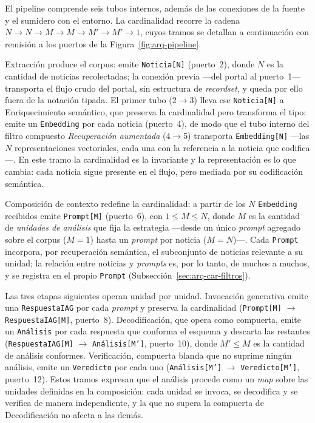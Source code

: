 \documentclass[12pt]{report}
\begin{document}
El pipeline comprende seis tubos internos, además de las conexiones de la fuente y el sumidero con el entorno. La cardinalidad recorre la cadena \(N \to N \to M \to M \to M' \to M' \to 1\), cuyos tramos se detallan a continuación con remisión a los puertos de la Figura~\ref{fig:arq-pipeline}.

Extracción produce el corpus: emite \texttt{Noticia[N]} (puerto~2), donde \(N\) es la cantidad de noticias recolectadas; la conexión previa ---del portal al puerto~1--- transporta el flujo crudo del portal, sin estructura de \textit{recordset}, y queda por ello fuera de la notación tipada. El primer tubo (2\(\to\)3) lleva ese \texttt{Noticia[N]} a Enriquecimiento semántico, que preserva la cardinalidad pero transforma el tipo: emite un \texttt{Embedding} por cada noticia (puerto~4), de modo que el tubo interno del filtro compuesto \textit{Recuperación aumentada} (4\(\to\)5) transporta \texttt{Embedding[N]} ---las \(N\) representaciones vectoriales, cada una con la referencia a la noticia que codifica---. En este tramo la cardinalidad es la invariante y la representación es lo que cambia: cada noticia sigue presente en el flujo, pero mediada por su codificación semántica.

Composición de contexto redefine la cardinalidad: a partir de los \(N\) \texttt{Embedding} recibidos emite \texttt{Prompt[M]} (puerto~6), con \(1 \le M \le N\), donde \(M\) es la cantidad de \textit{unidades de análisis} que fija la estrategia ---desde un único \textit{prompt} agregado sobre el corpus (\(M=1\)) hasta un \textit{prompt} por noticia (\(M=N\))---. Cada \texttt{Prompt} incorpora, por recuperación semántica, el subconjunto de noticias relevante a su unidad; la relación entre noticias y \textit{prompts} es, por lo tanto, de muchos a muchos, y se registra en el propio \texttt{Prompt} (Subsección~\ref{sec:arq-car-filtros}).

Las tres etapas siguientes operan unidad por unidad. Invocación generativa emite una \texttt{RespuestaIAG} por cada \textit{prompt} y preserva la cardinalidad (\texttt{Prompt[M]} \(\to\) \texttt{RespuestaIAG[M]}, puerto~8). Decodificación, que opera como compuerta, emite un \texttt{Análisis} por cada respuesta que conforma el esquema y descarta las restantes (\texttt{RespuestaIAG[M]} \(\to\) \texttt{Análisis[M']}, puerto~10), donde \(M' \le M\) es la cantidad de análisis conformes. Verificación, compuerta blanda que no suprime ningún análisis, emite un \texttt{Veredicto} por cada uno (\texttt{Análisis[M']} \(\to\) \texttt{Veredicto[M']}, puerto~12). Estos tramos expresan que el análisis procede como un \textit{map} sobre las unidades definidas en la composición: cada unidad se invoca, se decodifica y se verifica de manera independiente, y la que no supera la compuerta de Decodificación no afecta a las demás.
\end{document}
